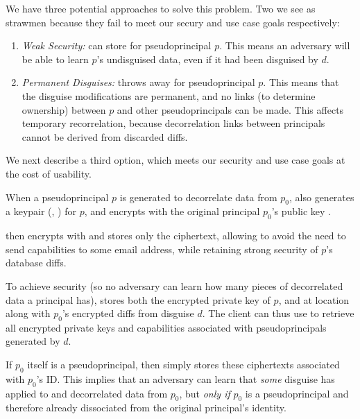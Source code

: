 We have three potential approaches to solve this problem. Two we see as strawmen because they fail
to meet our secury and use case goals respectively:
\begin{enumerate}
    \item \emph{Weak Security:} \sys can store  for pseudoprincipal $p$. This means
        an adversary will be able to learn $p$'s undisguised data, even if it had been disguised by
        $d$.

    \item \emph{Permanent Disguises:} \sys throws away  for pseudoprincipal $p$. This means that the
        disguise modifications are permanent, and no links (to determine ownership) between
        $p$ and other pseudoprincipals can be made. This affects temporary recorrelation, because
        decorrelation links between principals cannot be derived from discarded diffs.
\end{enumerate}

We next describe a third option, which meets our security and use
case goals at the cost of usability.

When a pseudoprincipal $p$ is generated to decorrelate data from $p_0$, \sys also generates a
keypair (, ) for $p$, and encrypts  with the original principal $p_0$'s
public key . 

\sys then encrypts  with  and stores only the ciphertext, allowing \sys to avoid
the need to send capabilities to some email address, while retaining strong security of $p$'s
database diffs. 

To achieve security (so no adversary can learn how many pieces of decorrelated data a principal
has), \sys stores both the encrypted private key of $p$, and  at location 
along with $p_0$'s encrypted diffs from disguise $d$. The client can thus use  to
retrieve all encrypted private keys and capabilities associated with pseudoprincipals generated by
$d$.

If $p_0$ itself is a pseudoprincipal, then \sys simply stores these ciphertexts associated with
$p_0$'s ID.  This implies that an adversary can learn that \emph{some} disguise has applied to and
decorrelated data from $p_0$, but \emph{only if} $p_0$ is a pseudoprincipal and therefore already
dissociated from the original principal's identity.  

